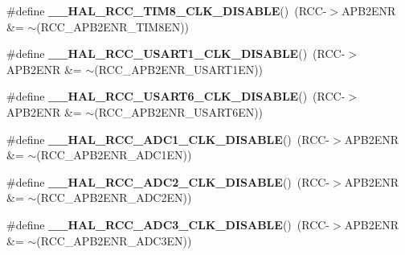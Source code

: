 \begin{DoxyCompactItemize}
\mbox{\label{group___r_c_c_ex___peripheral___clock___enable___disable_gabb93b1527822da05736d8fcae78597c9}} 
\#define {\bfseries \+\_\+\+\_\+\+H\+A\+L\+\_\+\+R\+C\+C\+\_\+\+T\+I\+M8\+\_\+\+C\+L\+K\+\_\+\+D\+I\+S\+A\+B\+LE}()~(R\+CC-\/$>$A\+P\+B2\+E\+NR \&= $\sim$(R\+C\+C\+\_\+\+A\+P\+B2\+E\+N\+R\+\_\+\+T\+I\+M8\+EN))
\item 
\mbox{\label{group___r_c_c_ex___peripheral___clock___enable___disable_gae0050944298552e9f02f56ec8634f5a6}} 
\#define {\bfseries \+\_\+\+\_\+\+H\+A\+L\+\_\+\+R\+C\+C\+\_\+\+U\+S\+A\+R\+T1\+\_\+\+C\+L\+K\+\_\+\+D\+I\+S\+A\+B\+LE}()~(R\+CC-\/$>$A\+P\+B2\+E\+NR \&= $\sim$(R\+C\+C\+\_\+\+A\+P\+B2\+E\+N\+R\+\_\+\+U\+S\+A\+R\+T1\+EN))
\item 
\mbox{\label{group___r_c_c_ex___peripheral___clock___enable___disable_gac4b142412ef1e3dab8dcf5d5f7ca4d92}} 
\#define {\bfseries \+\_\+\+\_\+\+H\+A\+L\+\_\+\+R\+C\+C\+\_\+\+U\+S\+A\+R\+T6\+\_\+\+C\+L\+K\+\_\+\+D\+I\+S\+A\+B\+LE}()~(R\+CC-\/$>$A\+P\+B2\+E\+NR \&= $\sim$(R\+C\+C\+\_\+\+A\+P\+B2\+E\+N\+R\+\_\+\+U\+S\+A\+R\+T6\+EN))
\item 
\mbox{\label{group___r_c_c_ex___peripheral___clock___enable___disable_ga80a9e4852bac07d3d9cc6390a361302a}} 
\#define {\bfseries \+\_\+\+\_\+\+H\+A\+L\+\_\+\+R\+C\+C\+\_\+\+A\+D\+C1\+\_\+\+C\+L\+K\+\_\+\+D\+I\+S\+A\+B\+LE}()~(R\+CC-\/$>$A\+P\+B2\+E\+NR \&= $\sim$(R\+C\+C\+\_\+\+A\+P\+B2\+E\+N\+R\+\_\+\+A\+D\+C1\+EN))
\item 
\mbox{\label{group___r_c_c_ex___peripheral___clock___enable___disable_gab85790f59a2033b43e7b58e2bfd91aa7}} 
\#define {\bfseries \+\_\+\+\_\+\+H\+A\+L\+\_\+\+R\+C\+C\+\_\+\+A\+D\+C2\+\_\+\+C\+L\+K\+\_\+\+D\+I\+S\+A\+B\+LE}()~(R\+CC-\/$>$A\+P\+B2\+E\+NR \&= $\sim$(R\+C\+C\+\_\+\+A\+P\+B2\+E\+N\+R\+\_\+\+A\+D\+C2\+EN))
\item 
\mbox{\label{group___r_c_c_ex___peripheral___clock___enable___disable_gaaf239c6212b26796bb449f240bcc1045}} 
\#define {\bfseries \+\_\+\+\_\+\+H\+A\+L\+\_\+\+R\+C\+C\+\_\+\+A\+D\+C3\+\_\+\+C\+L\+K\+\_\+\+D\+I\+S\+A\+B\+LE}()~(R\+CC-\/$>$A\+P\+B2\+E\+NR \&= $\sim$(R\+C\+C\+\_\+\+A\+P\+B2\+E\+N\+R\+\_\+\+A\+D\+C3\+EN))

\end{DoxyCompactItemize}
